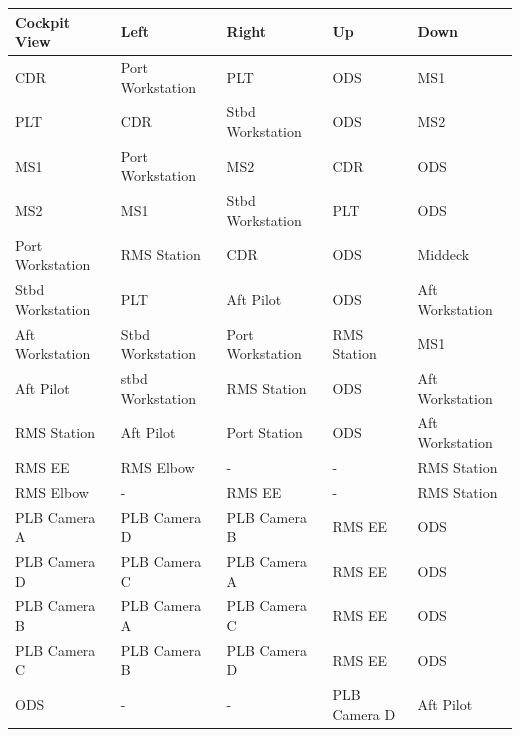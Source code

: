 \documentclass[13pt, letter,final]{article}
\begin{document}
\begin{tabular}{|l|l|l|l|l|}
	\hline
	Cockpit View & Left & Right & Up & Down \\
	\hline \hline
	CDR & Port Workstation & PLT & ODS & MS1 \\
	\hline
	PLT & CDR & Stbd Workstation & ODS & MS2 \\
	\hline
	MS1 & Port Workstation & MS2 & CDR & ODS \\
	\hline
	MS2 & MS1 & Stbd Workstation & PLT & ODS\\
	\hline
	Port Workstation & RMS Station & CDR & ODS & Middeck\\
	\hline
	Stbd Workstation & PLT & Aft Pilot & ODS & Aft Workstation\\
	\hline
	Aft Workstation & Stbd Workstation & Port Workstation & RMS Station & MS1\\
	\hline
	Aft Pilot & stbd Workstation & RMS Station & ODS & Aft Workstation\\
	\hline
	RMS Station & Aft Pilot & Port Station & ODS & Aft Workstation\\
	\hline
	RMS EE & RMS Elbow & - & - & RMS Station\\
	\hline
	RMS Elbow & - & RMS EE & - & RMS Station\\
	\hline
	PLB Camera A & PLB Camera D & PLB Camera B & RMS EE & ODS\\
	\hline
	PLB Camera D & PLB Camera C & PLB Camera A & RMS EE & ODS\\
	\hline
	PLB Camera B & PLB Camera A & PLB Camera C & RMS EE & ODS\\
	\hline
	PLB Camera C & PLB Camera B & PLB Camera D & RMS EE & ODS\\
	\hline
	ODS & - & - & PLB Camera D & Aft Pilot\\
	\hline
\end{tabular}
\newpage
\end{document}
